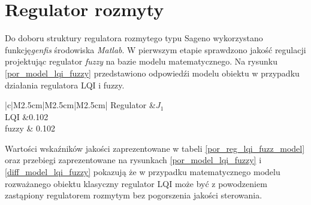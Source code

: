\section{Regulator rozmyty}
Do doboru struktury regulatora rozmytego typu Sageno wykorzystano funkcję\textit{genfis} środowiska \textit{Matlab}. W pierwszym etapie sprawdzono jakość regulacji projektując regulator \textit{fuzzy} na bazie modelu matematycznego. Na rysunku  \ref{por_model_lqi_fuzzy} przedstawiono odpowied\'zi modelu obiektu w przypadku działania regulatora LQI i fuzzy.\\
%
\begin{table}[h]
	\caption{Porównanie wska\'zników jakości regulator LQI i fuzzy dla modelu.}
	\label{por_reg_lqi_fuzz_model}
	\centering
	
	\begin{tabular}{|c|M{2.5cm}|M{2.5cm}|M{2.5cm}|}
		\hline
		Regulator &$J_1$\\
		\hline
		LQI &0.102\\
		\hline
		fuzzy & 0.102\\
		\hline
	\end{tabular}
\end{table}
\FloatBarrier
Wartości wska\'zników jakości zaprezentowane w tabeli \ref{por_reg_lqi_fuzz_model} oraz przebiegi zaprezentowane na rysunkach \ref{por_model_lqi_fuzzy} i \ref{diff_model_lqi_fuzzy} pokazują że w przypadku matematycznego modelu rozważanego obiektu klasyczny regulator LQI może być z powodzeniem zastąpiony regulatorem rozmytym bez pogorszenia jakości sterowania.

